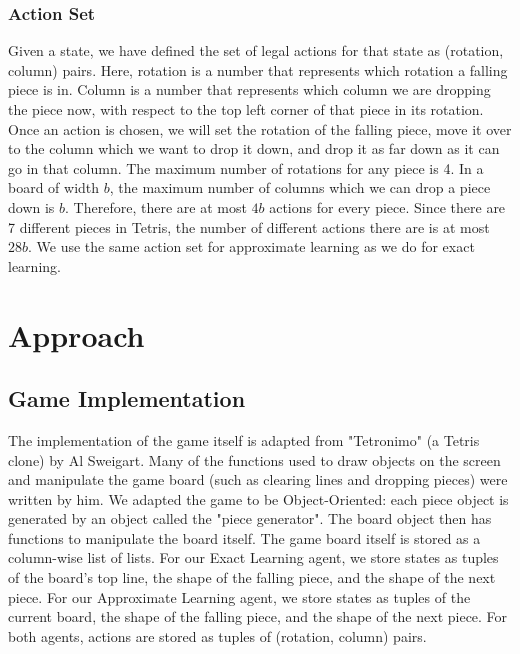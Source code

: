 \documentclass[11pt]{article}
\begin{document}
\subsubsection{Action Set}
Given a state, we have defined the set of legal actions for that state as (rotation, column) pairs. Here, rotation is a number that represents which rotation a falling piece is in. Column is a number that represents which column we are dropping the piece now, with respect to the top left corner of that piece in its rotation. Once an action is chosen, we will set the rotation of the falling piece, move it over to the column which we want to drop it down, and drop it as far down as it can go in that column. The maximum number of rotations for any piece is 4. In a board of width $b$, the maximum number of columns which we can drop a piece down is  $b$. Therefore, there are at most $4b$ actions for every piece. Since there are 7 different pieces in Tetris, the number of different actions there are is at most $28b$. We use the same action set for approximate learning as we do for exact learning.

\section{Approach}

\subsection{Game Implementation}
The implementation of the game itself is adapted from "Tetronimo" (a Tetris clone) by Al Sweigart. Many of the functions used to draw objects on the screen and manipulate the game board (such as clearing lines and dropping pieces) were written by him. We adapted the game to be Object-Oriented: each piece object is generated by an object called the "piece generator". The board object then has functions to manipulate the board itself. The game board itself is stored as a column-wise list of lists. For our Exact Learning agent, we store states as tuples of the board's top line, the shape of the falling piece, and the shape of the next piece. For our Approximate Learning agent, we store states as tuples of the current board, the shape of the falling piece, and the shape of the next piece. For both agents, actions are stored as tuples of (rotation, column) pairs.
\end{document}
